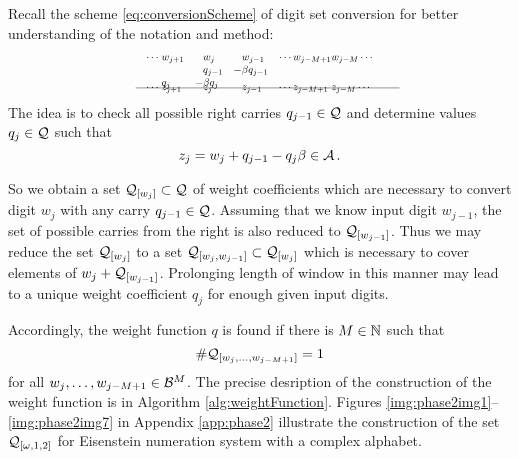    Recall the scheme \eqref{eq:conversionScheme} of digit set conversion for better understanding of the notation and method:
    \begin{align*}
        \hspace{130pt}\cdots\; &w_{j+1}&\!\! &w_j  & \!\!  &w_{j-1}&\cdots w_{j-M+1} &w_{j-M}\cdots \hspace{130pt} \\[-3pt] 
                         & &       &q_{j-1}& -&\beta q_{j-1} \\[-3pt]
                           &q_j&   -&\beta q_j &&\\[-15pt]      
    \intertext{\hspace{120pt}\line(1,0){250}} 
          \vspace{-15pt}
          \\[-30pt]
     \cdots\; &z_{j+1}& &z_j& &z_{j-1}& \cdots z_{j-M+1}\; &z_{j-M}\cdots                     
    \end{align*}     
    The idea is to check all possible right carries $q_{j-1}\in\mathcal{Q}$ and determine values $q_j\in\mathcal{Q}$ such that 
    $$
    z_j=w_j + q_{j-1} - q_j \beta \in \mathcal{A} \,.
    $$  
    
    So we obtain a set $\mathcal{Q}_{[w_j]}\subset\mathcal{Q}$ of weight coefficients which are necessary to convert digit $w_j$ with any carry $q_{j-1}\in\mathcal{Q}$. Assuming that we know input digit $w_{j-1}$, the set of possible carries from the right is also reduced to $\mathcal{Q}_{[w_{j-1}]}$. Thus we may reduce the set $\mathcal{Q}_{[w_j]}$ to a set $\mathcal{Q}_{[w_j,w_{j-1}]}\subset \mathcal{Q}_{[w_j]}$ which is necessary to cover elements of $w_j + \mathcal{Q}_{[w_{j-1}]}$. Prolonging length of window in this manner may lead to a unique weight coefficient $q_j$ for enough given input digits.  
    
    Accordingly, the weight function $q$ is found if there is $M\in\mathbb{N}$ such that 
    $$
    \#\mathcal{Q}_{[w_{j},\dots, w_{j-M+1}]}=1
    $$
    for all $w_{j},\dots, w_{j-M+1} \in \mathcal{B}^M$. The precise desription of the construction of the weight function is in  Algorithm \ref{alg:weightFunction}.  
 Figures \ref{img:phase2img1}--\ref{img:phase2img7} in Appendix \ref{app:phase2} illustrate the construction of the set $\mathcal{Q}_{[\omega,1,2]}$ for Eisenstein numeration system with a complex alphabet.   
    
